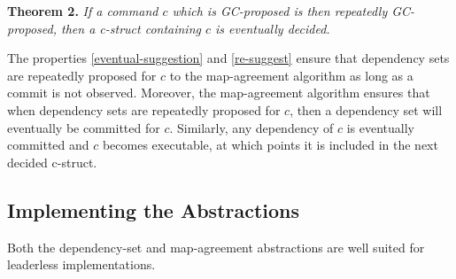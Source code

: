 \noindent\textbf{Theorem 2.}
\emph{If a command $c$ which is GC-proposed is then repeatedly GC-proposed, then a c-struct containing $c$ is eventually decided.}

The properties \ref{eventual-suggestion} and \ref{re-suggest} ensure that dependency sets are repeatedly proposed for $c$ to the map-agreement algorithm as long as a commit is not observed. Moreover, the map-agreement algorithm ensures that when dependency sets are repeatedly proposed for $c$, then a dependency set will eventually be committed for $c$. Similarly, any dependency of $c$ is eventually committed and $c$ becomes executable, at which points it is included in the next decided c-struct.



\begin{comment}
\textbf{Lemma 3}
Consider $g_1$ and $g_2$. Assume that if $v\in V\left( g_1 \right)$ and $v\in V\left( g_2 \right)$ then $n\left( g_1 \right)=n\left( g2 \right)$.

\textbf{Lemma 4}
If $m_p\subseteq m_q$

\end{comment}

\subsection{Implementing the Abstractions}
Both the dependency-set and map-agreement abstractions are well suited for leaderless implementations.

